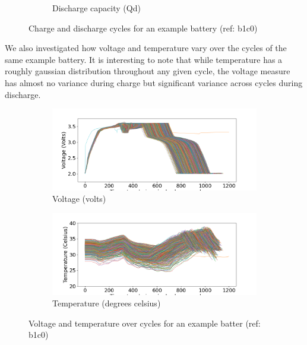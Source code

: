 \documentclass{article}
\begin{document}
\begin{itemize}
\begin{figure}[H]
\begin{subfigure}[b]{0.32\linewidth}
                \caption{Discharge capacity (Qd)}
            \end{subfigure}
            \caption{Charge and discharge cycles for an example battery (ref: b1c0)}
            \label{fig:1c}
        \end{figure}

    We also investigated how voltage and temperature vary over the cycles of the same example battery. It is interesting to note that while temperature has a roughly gaussian distribution throughout any given cycle, the voltage measure has almost no variance during charge but significant variance across cycles during discharge. 
    
        \begin{figure}[H]
            \centering
            \begin{subfigure}[b]{0.49\linewidth}
                \includegraphics[width=\linewidth]{figs/b1c0_voltage_intracycle.png}
                \caption{Voltage (volts)}
            \end{subfigure}
            \begin{subfigure}[b]{0.49\linewidth}
                \includegraphics[width=\linewidth]{figs/b1c0_temp_intracycle.png}
                \caption{Temperature (degrees celsius)}
            \end{subfigure}
            \caption{Voltage and temperature over cycles for an example batter (ref: b1c0)}
            \label{fig:1d}
        \end{figure}
        

\end{itemize}
\end{document}

